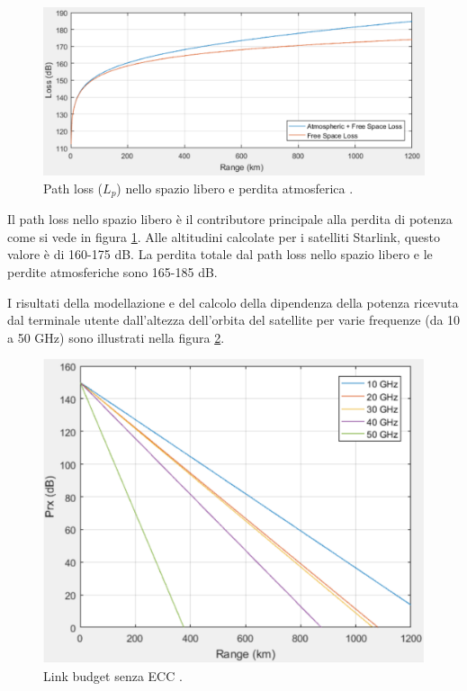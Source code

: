 
\begin{figure}[htbp]
  \centering
  \includegraphics[width=0.8\linewidth]{./res/img/free_space_path_loss_atm_loss.png}
  \caption{Path loss ($L_p$) nello spazio libero e perdita atmosferica \cite{rozenvasser_estimation_2023}.}
  \label{fig:free-space-path-loss-atm-loss}
\end{figure}

Il path loss nello spazio libero è il contributore principale alla perdita di potenza come si vede in figura \ref{fig:free-space-path-loss-atm-loss}.
Alle altitudini calcolate per i satelliti Starlink, questo valore è di 160-175 dB.
La perdita totale dal path loss nello spazio libero e le perdite atmosferiche sono 165-185 dB.

I risultati della modellazione e del calcolo della dipendenza della potenza ricevuta dal terminale utente dall'altezza dell'orbita del satellite per varie frequenze (da 10 a 50 GHz) sono illustrati nella figura \ref{fig:link-budget-wo-ecc}.

\begin{figure}[htbp]
  \centering
  \includegraphics[width=0.8\linewidth]{./res/img/link_budget_wo_ecc.png}
  \caption{Link budget senza \ac{ECC} \cite{rozenvasser_estimation_2023}.}
  \label{fig:link-budget-wo-ecc}
\end{figure}

